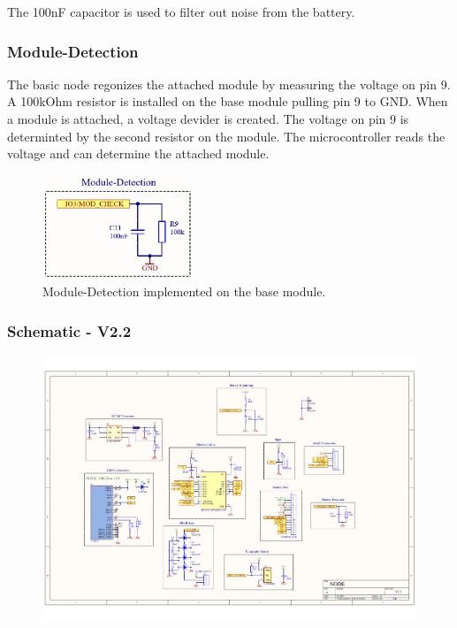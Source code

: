         The 100nF capacitor is used to filter out noise from the battery.

    \subsubsection{Module-Detection}
    
        The basic node regonizes the attached module by measuring the voltage on pin 9.
        A 100kOhm resistor is installed on the base module pulling pin 9 to GND. 
        When a module is attached, a voltage devider is created. The voltage on pin 9 is 
        determinted by the second resistor on the module. The microcontroller reads the
        voltage and can determine the attached module. 
    
    \begin{figure}[H]
        \centering
        \includegraphics[width=0.4\textwidth]{assets/HW/Node-Module-Check.png}
        \caption{Module-Detection implemented on the base module.}
    \end{figure}
    
    
    
    \subsubsection{Schematic - V2.2}
      
        
    \begin{figure}[H]
        \centering
        \includegraphics[scale=0.70,page=1, angle=270]{assets/HW/PDF-Schematic/Node-V2.2.pdf}
        
    \end{figure}
    

